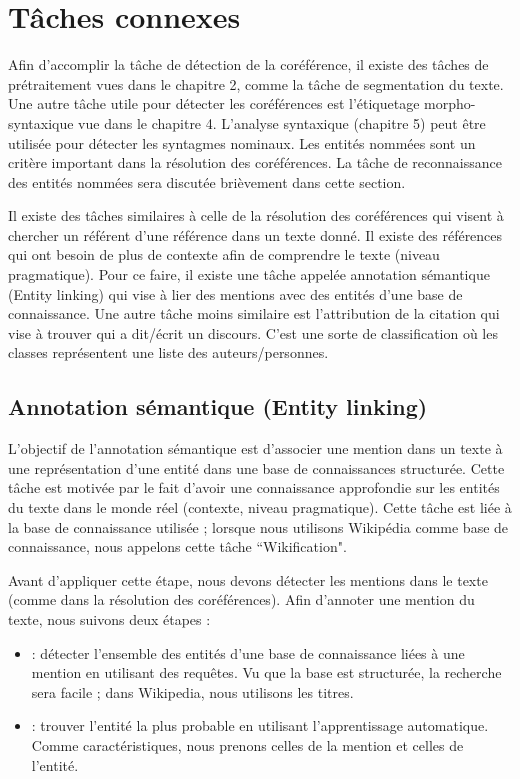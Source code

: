 \documentclass{KodeBook}
\begin{document}
\section{Tâches connexes}

Afin d'accomplir la tâche de détection de la coréférence, il existe des tâches de prétraitement vues dans le chapitre 2, comme la tâche de segmentation du texte. 
Une autre tâche utile pour détecter les coréférences est l'étiquetage morpho-syntaxique vue dans le chapitre 4.
L'analyse syntaxique (chapitre 5) peut être utilisée pour détecter les syntagmes nominaux. 
Les entités nommées sont un critère important dans la résolution des coréférences.
La tâche de reconnaissance des entités nommées sera discutée brièvement dans cette section.

Il existe des tâches similaires à celle de la résolution des coréférences qui visent à chercher un référent d'une référence dans un texte donné. 
Il existe des références qui ont besoin de plus de contexte afin de comprendre le texte (niveau pragmatique). 
Pour ce faire, il existe une tâche appelée annotation sémantique (Entity linking) qui vise à lier des mentions avec des entités d'une base de connaissance. 
Une autre tâche moins similaire est l'attribution de la citation qui vise à trouver qui a dit/écrit un discours. 
C'est une sorte de classification où les classes représentent une liste des auteurs/personnes.


\subsection{Annotation sémantique (Entity linking)}

L'objectif de l'annotation sémantique est d'associer une mention dans un texte à une représentation d'une entité dans une base de connaissances structurée. 
Cette tâche est motivée par le fait d'avoir une connaissance approfondie sur les entités du texte dans le monde réel (contexte, niveau pragmatique).
Cette tâche est liée à la base de connaissance utilisée ; lorsque nous utilisons Wikipédia comme base de connaissance, nous appelons cette tâche ``Wikification".

Avant d'appliquer cette étape, nous devons détecter les mentions dans le texte (comme dans la résolution des coréférences).
Afin d'annoter une mention du texte, nous suivons deux étapes :
\begin{itemize}
	\item {} : détecter l'ensemble des entités d'une base de connaissance liées à une mention en utilisant des requêtes.
	Vu que la base est structurée, la recherche sera facile ; dans Wikipedia, nous utilisons les titres.
	\item {} : trouver l'entité la plus probable en utilisant l'apprentissage automatique. 
	Comme caractéristiques, nous prenons celles de la mention et celles de l'entité.
\end{itemize}
\end{document}
